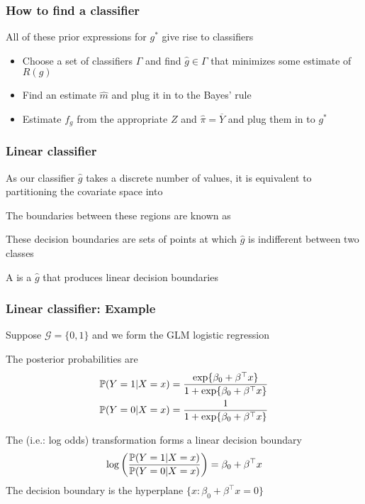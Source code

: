 \documentclass[12pt]{beamer}
\begin{document}
\begin{frame}
\frametitle{How to find a classifier}
All of these prior expressions for $g^*$ give rise to classifiers
\begin{itemize}
\item {}  Choose a set of classifiers $\Gamma$ and find
$\hat{g} \in \Gamma$ that minimizes some estimate of $R(g)$

\item  {}  Find an estimate $\hat{m}$ and plug it in to the Bayes' rule
\item  {} Estimate $f_g$ from the appropriate $Z$ and $\hat{\pi} = \overline{Y}$
and plug them in to $g^*$
\end{itemize}
\end{frame}


\begin{frame}
\frametitle{Linear classifier}
As our classifier $\hat{g}$ takes a discrete number of values, it is equivalent
to partitioning the covariate space into 

\vsp
The boundaries between these regions are known as 

\vsp
These decision boundaries are sets of points at which $\hat{g}$ is indifferent between 
two classes

\vsp
A  is a $\hat{g}$ that produces linear decision boundaries

\end{frame}

\begin{frame}[fragile]
\frametitle{Linear classifier: Example}
Suppose $\mathcal{G} = \{ 0,1\}$ and we form the GLM logistic regression

\vsp
The posterior probabilities are
\begin{align*}
\P(Y = 1 | X= x)  & = \frac{\exp\{\beta_0 + \beta^{\top}x\}}{1 + \exp\{\beta_0 + \beta^{\top}x\}} \\
\P(Y = 0 | X= x) & = \frac{1}{1 + \exp\{\beta_0 + \beta^{\top}x\}}
\end{align*}

The  (i.e.: log odds) transformation forms a linear decision boundary
\[
\log\left( \frac{\P(Y = 1 | X = x)}{\P(Y = 0 | X = x) } \right) = \beta_0 + \beta^{\top} x
\]
The decision boundary is the hyperplane $\{x : \beta_0 + \beta^{\top} x = 0\}$

\end{frame}
\end{document}
